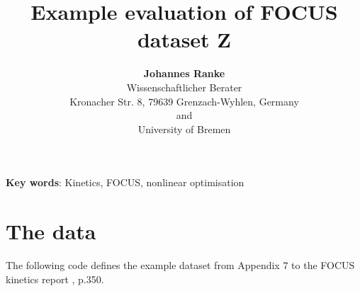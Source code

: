 \documentclass[12pt,a4paper]{article}\usepackage[]{graphicx}\usepackage[]{color}
\begin{document}
\title{Example evaluation of FOCUS dataset Z}
\author{\textbf{Johannes Ranke} \\[0.5cm]
Wissenschaftlicher Berater\\
Kronacher Str. 8, 79639 Grenzach-Wyhlen, Germany\\[0.5cm]
and\\[0.5cm]
University of Bremen\\
}
\maketitle

\thispagestyle{empty} \setcounter{page}{0}

\clearpage

\tableofcontents

\textbf{Key words}: Kinetics, FOCUS, nonlinear optimisation

\section{The data}

The following code defines the example dataset from Appendix 7 to the FOCUS kinetics
report \citep{FOCUSkinetics2011}, p.350.
\end{document}
